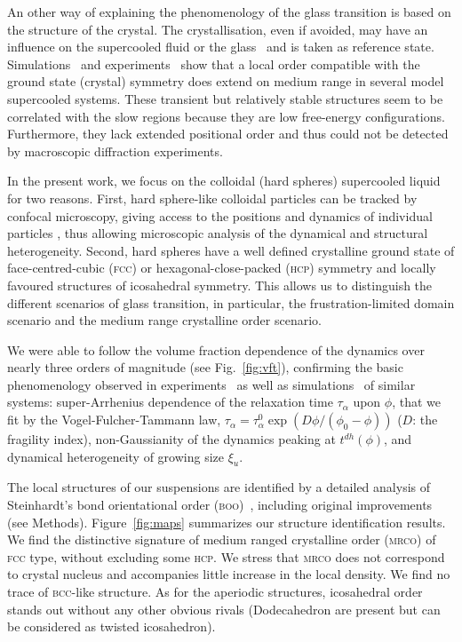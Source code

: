 An other way of explaining the phenomenology of the glass transition is based on the structure of the crystal. The crystallisation, even if avoided, may have an influence on the supercooled fluid or the glass~\citep{TanakaGJPCM, Cavagna2003} and is taken as reference state. Simulations~\cite{tanaka2010critical, Pedersen2010, Coslovich2011} and experiments~\citep{tanaka2010critical} show that a local order compatible with the ground state (crystal) symmetry does extend on medium range in several model supercooled systems. These transient but relatively stable structures seem to be correlated with the slow regions because they are low free-energy configurations. Furthermore, they lack extended positional order and thus could not be detected by macroscopic diffraction experiments.

In the present work, we focus on the colloidal (hard spheres) supercooled liquid \cite{pusey1987ogt} for two reasons. First, hard sphere-like colloidal particles can be tracked by confocal microscopy, giving access to the positions and dynamics of individual particles \cite{kegel2000swe, weeks2000}, thus allowing microscopic analysis of the dynamical and structural heterogeneity. Second, hard spheres have a well defined crystalline ground state of face-centred-cubic (\textsc{fcc}) or hexagonal-close-packed (\textsc{hcp}) symmetry and locally favoured structures of icosahedral symmetry. This allows us to distinguish the different scenarios of glass transition, in particular, the frustration-limited domain scenario and the medium range crystalline order scenario.



We were able to follow the volume fraction dependence of the dynamics over nearly three orders of magnitude (see Fig.~\ref{fig:vft}), confirming the basic phenomenology observed in experiments~\citep{pusey1987ogt, kegel2000swe, weeks2000, BerthierR} as well as simulations~\citep{tanaka2010critical} of similar systems: super-Arrhenius dependence of the relaxation time $\tau_\alpha$ upon $\phi$, that we fit by the Vogel-Fulcher-Tammann law, 
$\tau_\alpha=\tau_\alpha^0 \exp(D\phi/(\phi_0-\phi))$ ($D$: the fragility index), non-Gaussianity of the dynamics peaking at $t^{dh}(\phi)$, and dynamical heterogeneity of growing size $\xi_u$. 



The local structures of our suspensions are identified by a detailed analysis of Steinhardt's bond orientational order (\textsc{boo})~\citep{steinhardt1983boo}, including original improvements (see Methods). Figure~\ref{fig:maps} summarizes our structure identification results. We find the distinctive signature of medium ranged crystalline order (\textsc{mrco}) of \textsc{fcc} type, without excluding some \textsc{hcp}. We stress that \textsc{mrco} does not correspond to crystal nucleus and accompanies little increase in the local density. We find no trace of \textsc{bcc}-like structure. As for the aperiodic structures, icosahedral order stands out without any other obvious rivals (Dodecahedron are present but can be considered as twisted icosahedron).



